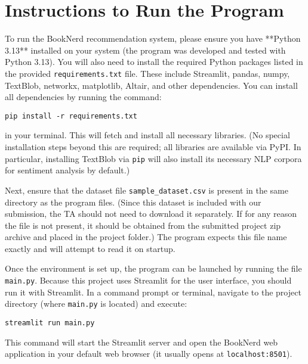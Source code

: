 \documentclass[11pt]{article}
\begin{document}
\section{Instructions to Run the Program}
To run the BookNerd recommendation system, please ensure you have **Python 3.13** installed on your system (the program was developed and tested with Python 3.13). You will also need to install the required Python packages listed in the provided \texttt{requirements.txt} file. These include Streamlit, pandas, numpy, TextBlob, networkx, matplotlib, Altair, and other dependencies. You can install all dependencies by running the command:

\begin{verbatim}
pip install -r requirements.txt
\end{verbatim}

in your terminal. This will fetch and install all necessary libraries. (No special installation steps beyond this are required; all libraries are available via PyPI. In particular, installing TextBlob via \texttt{pip} will also install its necessary NLP corpora for sentiment analysis by default.)

Next, ensure that the dataset file \texttt{sample\_dataset.csv} is present in the same directory as the program files. (Since this dataset is included with our submission, the TA should not need to download it separately. If for any reason the file is not present, it should be obtained from the submitted project zip archive and placed in the project folder.) The program expects this file name exactly and will attempt to read it on startup.

Once the environment is set up, the program can be launched by running the file \texttt{main.py}. Because this project uses Streamlit for the user interface, you should run it with Streamlit. In a command prompt or terminal, navigate to the project directory (where \texttt{main.py} is located) and execute:

\begin{verbatim}
streamlit run main.py
\end{verbatim}

This command will start the Streamlit server and open the BookNerd web application in your default web browser (it usually opens at \texttt{localhost:8501}). 
\end{document}
